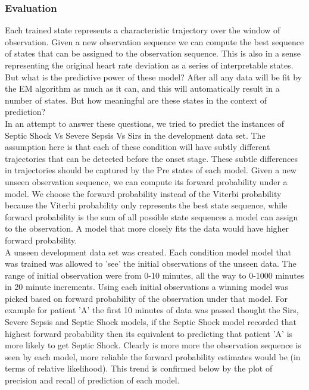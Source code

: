 \documentclass[12pt,solutions]{article}
\begin{document}
\subsubsection{Evaluation}
Each trained state represents a characteristic trajectory over the window of observation.  Given a new observation sequence we can compute the best sequence of states that can be assigned to the observation sequence. This is also in a sense representing the original heart rate deviation as a series of interpretable states. But what is the predictive power of these model? After all any data will be fit by the EM algorithm as much as it can, and this will automatically result in a number of states. But how meaningful are these states in the context of prediction?\\
In an attempt to answer these questions, we tried to predict the instances of Septic Shock Vs Severe Sepsis Vs Sirs in the development data set. The assumption here is that each of these condition will have subtly different trajectories that can be detected before the onset stage. These subtle differences in trajectories should be captured by the Pre states of each model. Given a new unseen observation sequence, we can compute its forward probability under a model.  We choose the forward probability instead of the Viterbi probability because the Viterbi probability only represents the best state sequence, while forward probability is the sum of all possible state sequences a model can assign to the observation. A model that more closely fits the data would have higher forward probability.\\

A unseen development data set was created. Each condition model model that was trained was allowed to 'see' the initial observations of the unseen data. The range of initial observation were from 0-10 minutes, all the way to 0-1000 minutes in 20 minute increments. Using each initial observations a winning model was picked based on forward probability of the observation under that model. For example for patient 'A' the first 10 minutes of data was passed thought the Sirs, Severe Sepsis and Septic Shock models, if the Septic Shock model recorded that highest forward probability then its equivalent to predicting that patient 'A' is more likely to get Septic Shock. Clearly is more more the observation sequence is seen by each model, more reliable the forward probability estimates would be (in terms of relative likelihood). This trend is confirmed below by the plot of precision and recall of prediction of each model.
\end{document}
